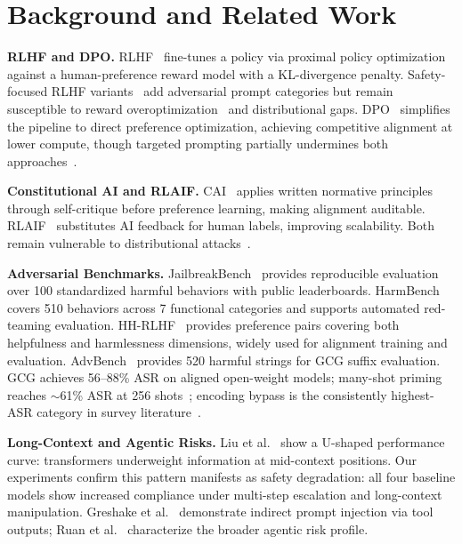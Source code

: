 \documentclass[conference]{IEEEtran}
\begin{document}
\section{Background and Related Work}
\label{sec:background}

\textbf{RLHF and DPO.}
RLHF~\cite{christiano2017deep,ouyang2022training} fine-tunes a policy via
proximal policy optimization against a human-preference reward model with
a KL-divergence penalty.
Safety-focused RLHF variants~\cite{bai2022training} add adversarial prompt
categories but remain susceptible to reward
overoptimization~\cite{gao2023scaling} and distributional gaps.
DPO~\cite{rafailov2023direct} simplifies the pipeline to direct preference
optimization, achieving competitive alignment at lower compute, though targeted
prompting partially undermines both approaches~\cite{yang2023shadow}.

\textbf{Constitutional AI and RLAIF.}
CAI~\cite{bai2022constitutional} applies written normative principles through
self-critique before preference learning, making alignment auditable.
RLAIF~\cite{lee2023rlaif} substitutes AI feedback for human labels, improving
scalability.
Both remain vulnerable to distributional
attacks~\cite{zou2023universal,anil2024many}.

\textbf{Adversarial Benchmarks.}
JailbreakBench~\cite{chao2024jailbreakbench} provides reproducible evaluation
over 100 standardized harmful behaviors with public leaderboards.
HarmBench~\cite{mazeika2024harmbench} covers 510 behaviors across 7 functional
categories and supports automated red-teaming evaluation.
HH-RLHF~\cite{bai2022training} provides preference pairs covering both
helpfulness and harmlessness dimensions, widely used for alignment training and
evaluation.
AdvBench~\cite{zou2023universal} provides 520 harmful strings for GCG suffix
evaluation.
GCG achieves 56--88\% ASR on aligned open-weight models; many-shot priming
reaches $\sim$61\% ASR at 256 shots~\cite{anil2024many}; encoding bypass is
the consistently highest-ASR category in survey
literature~\cite{chu2024comprehensive,yi2024jailbreak}.

\textbf{Long-Context and Agentic Risks.}
Liu et al.~\cite{liu2024lost} show a U-shaped performance curve: transformers
underweight information at mid-context positions.
Our experiments confirm this pattern manifests as safety degradation: all four
baseline models show increased compliance under multi-step escalation and
long-context manipulation.
Greshake et al.~\cite{greshake2023not} demonstrate indirect prompt injection
via tool outputs; Ruan et al.~\cite{ruan2024identifying} characterize the
broader agentic risk profile.
\end{document}

